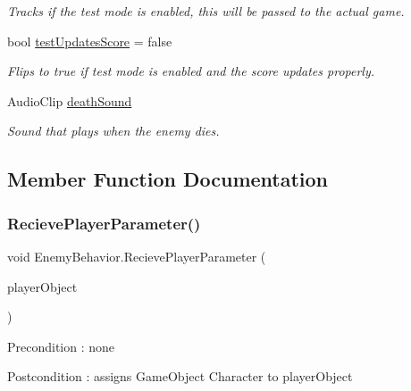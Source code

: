 \begin{DoxyCompactItemize}
\begin{DoxyCompactList}\small\item\em Tracks if the test mode is enabled, this will be passed to the actual game. \end{DoxyCompactList}\item 
\mbox{\label{class_enemy_behavior_a45bada468af071f8ff4ff0f8b6d5a443}} 
bool \mbox{\hyperlink{class_enemy_behavior_a45bada468af071f8ff4ff0f8b6d5a443}{test\+Updates\+Score}} = false
\begin{DoxyCompactList}\small\item\em Flips to true if test mode is enabled and the score updates properly. \end{DoxyCompactList}\item 
\mbox{\label{class_enemy_behavior_a82176ba450bef73880b2ff7db3123037}} 
Audio\+Clip \mbox{\hyperlink{class_enemy_behavior_a82176ba450bef73880b2ff7db3123037}{death\+Sound}}
\begin{DoxyCompactList}\small\item\em Sound that plays when the enemy dies. \end{DoxyCompactList}\end{DoxyCompactItemize}


\subsection{Member Function Documentation}
\mbox{\label{class_enemy_behavior_a1a0d6efe8ce9e53a0e4bddd06c379097}} 
\subsubsection{\texorpdfstring{RecievePlayerParameter()}{RecievePlayerParameter()}}
{\footnotesize\ttfamily void Enemy\+Behavior.\+Recieve\+Player\+Parameter (\begin{DoxyParamCaption}\item[{Game\+Object}]{player\+Object }\end{DoxyParamCaption})}

\begin{DoxyPrecond}{Precondition}
\+: none 
\end{DoxyPrecond}
\begin{DoxyPostcond}{Postcondition}
\+: assigns Game\+Object Character to player\+Object 
\end{DoxyPostcond}

